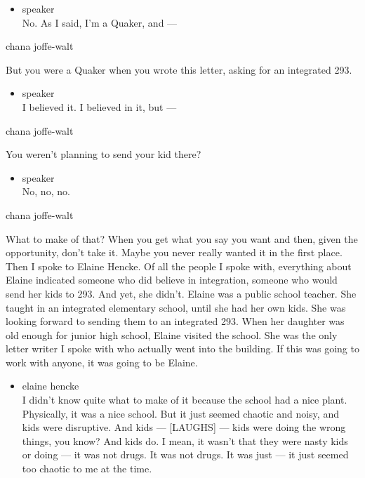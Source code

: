 \begin{itemize}
\tightlist
\item
  speaker\\
  No. As I said, I'm a Quaker, and ---
\end{itemize}

chana joffe-walt

But you were a Quaker when you wrote this letter, asking for an
integrated 293.

\begin{itemize}
\tightlist
\item
  speaker\\
  I believed it. I believed in it, but ---
\end{itemize}

chana joffe-walt

You weren't planning to send your kid there?

\begin{itemize}
\tightlist
\item
  speaker\\
  No, no, no.
\end{itemize}

chana joffe-walt

What to make of that? When you get what you say you want and then, given
the opportunity, don't take it. Maybe you never really wanted it in the
first place. Then I spoke to Elaine Hencke. Of all the people I spoke
with, everything about Elaine indicated someone who did believe in
integration, someone who would send her kids to 293. And yet, she
didn't. Elaine was a public school teacher. She taught in an integrated
elementary school, until she had her own kids. She was looking forward
to sending them to an integrated 293. When her daughter was old enough
for junior high school, Elaine visited the school. She was the only
letter writer I spoke with who actually went into the building. If this
was going to work with anyone, it was going to be Elaine.

\begin{itemize}
\tightlist
\item
  elaine hencke\\
  I didn't know quite what to make of it because the school had a nice
  plant. Physically, it was a nice school. But it just seemed chaotic
  and noisy, and kids were disruptive. And kids --- {[}LAUGHS{]} ---
  kids were doing the wrong things, you know? And kids do. I mean, it
  wasn't that they were nasty kids or doing --- it was not drugs. It was
  not drugs. It was just --- it just seemed too chaotic to me at the
  time.
\end{itemize}

